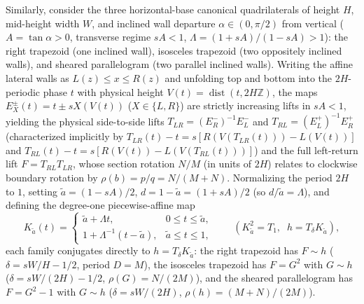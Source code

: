 \documentclass[11pt,reqno]{amsart}
\theoremstyle{definition}
\theoremstyle{remark}
\newcommand{\Z}{\mathbb{Z}}
\DeclareMathOperator{\dist}{dist}
\begin{document}
Similarly, consider the three horizontal-base canonical quadrilaterals of height $H$, mid-height width $W$, and inclined wall departure $\alpha \in (0,\pi/2)$ from vertical ($A = \tan\alpha > 0$, transverse regime $sA < 1$, $\Lambda = (1+sA)/(1-sA) > 1$): the right trapezoid (one inclined wall), isosceles trapezoid (two oppositely inclined walls), and sheared parallelogram (two parallel inclined walls). Writing the affine lateral walls as $L(z) \le x \le R(z)$ and unfolding top and bottom into the $2H$-periodic phase $t$ with physical height $V(t) = \dist(t, 2H\Z)$, the maps $E_X^\pm(t) = t \pm sX(V(t))$ ($X \in \{L, R\}$) are strictly increasing lifts in $sA < 1$, yielding the physical side-to-side lifts $T_{LR} = (E_R^-)^{-1} E_L^-$ and $T_{RL} = (E_L^+)^{-1} E_R^+$ (characterized implicitly by $T_{LR}(t) - t = s[R(V(T_{LR}(t))) - L(V(t))]$ and $T_{RL}(t) - t = s[R(V(t)) - L(V(T_{RL}(t)))]$) and the full left-return lift $F = T_{RL}T_{LR}$, whose section rotation $N/M$ (in units of $2H$) relates to clockwise boundary rotation by $\rho(b) = p/q = N/(M+N)$. Normalizing the period $2H$ to $1$, setting $\tilde a = (1-sA)/2$, $d = 1 - \tilde a = (1+sA)/2$ (so $d/\tilde a = \Lambda$), and defining the degree-one piecewise-affine map
\[
  K_{\tilde a}(t) =
  \begin{cases}
    \tilde a + \Lambda t, & 0 \le t \le \tilde a, \\
    1 + \Lambda^{-1}(t - \tilde a), & \tilde a \le t \le 1,
  \end{cases}
  \qquad (K_{\tilde a}^2 = T_1,\;\; h = T_\delta K_{\tilde a}),
\]
each family conjugates directly to $h = T_\delta K_{\tilde a}$: the right trapezoid has $F \sim h$ ($\delta = sW/H - 1/2$, period $D = M$), the isosceles trapezoid has $F = G^2$ with $G \sim h$ ($\delta = sW/(2H) - 1/2$, $\rho(G) = N/(2M)$), and the sheared parallelogram has $F = G^2 - 1$ with $G \sim h$ ($\delta = sW/(2H)$, $\rho(h) = (M+N)/(2M)$).
\end{document}
